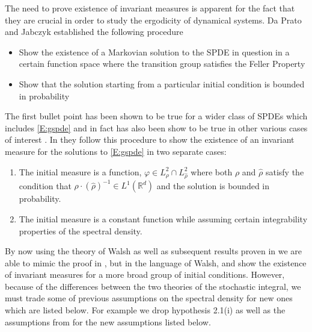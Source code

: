 \documentclass[a4paper,11pt]{article}%
\numberwithin{equation}{section}
\theoremstyle{plain}
\theoremstyle{definition}
\newcommand{\R}{\mathbb{R}}
\begin{document}
The need to prove existence of invariant measures is apparent for the fact that they are crucial in order to study the
ergodicity of dynamical systems. Da Prato and Jabczyk \cite{DZp92} established the following procedure
\begin{itemize}
	\item Show the existence of a Markovian solution to the SPDE in question in a certain function space where the
		transition group satisfies the Feller Property
	\item Show that the solution starting from a particular initial condition is bounded in probability
\end{itemize}
The first bullet point has been shown to be true \cite{DZ96} for a wider class of SPDEs which includes \eqref{E:gspde}
and in fact has also been show to be true in other various cases of interest \cite{Cer01, MS99}.
In \cite{TessitoreZabczyk98M} they follow this procedure to show the existence of an invariant measure for the solutions to
\eqref{E:gspde} in two separate cases:
\begin{enumerate}
	\item The initial measure is a function, $\varphi \in L^2_\rho \cap L^2_{\hat\rho}$ where both $\rho$ and
		$\hat\rho$ satisfy the condition that $\rho \cdot (\hat\rho)^{-1} \in L^1(\R^d)$ and the solution is
		bounded in probability.
	\item The initial measure is a constant function while assuming certain integrability properties of the spectral
		density.
\end{enumerate}
By now using the theory of Walsh as well as subsequent results proven in \cite{CH16Comparison} we are able to mimic the
proof in \cite{TessitoreZabczyk98M}, but in the language of Walsh, and show the existence of invariant measures for a
more broad group of initial conditions. However, because of the differences between the two theories of the stochastic
integral, we must trade some of previous assumptions on the spectral density for new ones which are listed below. For
example we drop hypothesis 2.1(i) as well as the assumptions from \cite[Theorem 3.3]{TessitoreZabczyk98M} for the new
assumptions listed below.
\end{document}
